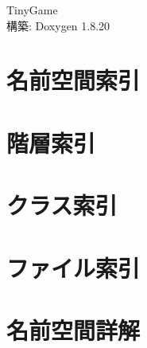 \let\mypdfximage\pdfximage\def\pdfximage{\immediate\mypdfximage}\documentclass[twoside]{book}
\newcommand{\+}{\discretionary{\mbox{\scriptsize$\hookleftarrow$}}{}{}}
\newcommand{\clearemptydoublepage}{%
  \newpage{\pagestyle{empty}\cleardoublepage}%
}
\begin{document}
\begin{CJK}{UTF8}{min}

\hypersetup{pageanchor=false,
             bookmarksnumbered=true,
             pdfencoding=unicode
            }
\begin{titlepage}
\vspace*{7cm}
\begin{center}%
{\Large Tiny\+Game }\\
\vspace*{1cm}
{\large 構築\+: Doxygen 1.8.20}\\
\end{center}
\end{titlepage}
\clearemptydoublepage
{}
\tableofcontents
\clearemptydoublepage
{}
\hypersetup{pageanchor=true}

\chapter{名前空間索引}

\chapter{階層索引}

\chapter{クラス索引}

\chapter{ファイル索引}

\chapter{名前空間詳解}



















\end{CJK}
\end{document}
